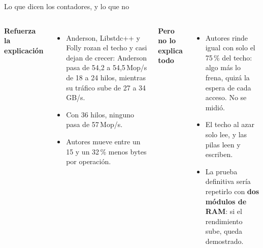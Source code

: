 \begin{frame}{Lo que dicen los contadores, y lo que no}
  \begin{columns}[T]
    {\color{verde}\bfseries Refuerza la explicación}\par\smallskip
    \begin{itemize}\footnotesize
      \item Anderson, Libstdc++ y Folly rozan el techo y casi dejan de crecer: Anderson pasa de 54,2 a 54,5\,Mop/s de 18 a 24 hilos, mientras su tráfico sube de 27 a 34\,GB/s.
      \item Con 36 hilos, ninguno pasa de 57\,Mop/s.
      \item Autores mueve entre un 15 y un 32\,\% menos bytes por operación.
    \end{itemize}
    {\color{rojo}\bfseries Pero no lo explica todo}\par\smallskip
    \begin{itemize}\footnotesize
      \item Autores rinde igual con solo el 75\,\% del techo: algo más lo frena, quizá la espera de cada acceso. No se midió.
      \item El techo al azar solo lee, y las pilas leen y escriben.
      \item La prueba definitiva sería repetirlo con \textbf{dos módulos de RAM}: si el rendimiento sube, queda demostrado.
    \end{itemize}
  \end{columns}
  \vfill
\end{frame}

